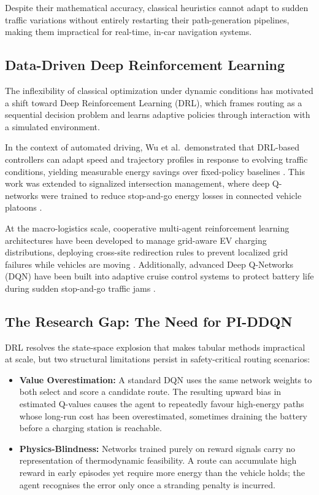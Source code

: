 \documentclass[conference]{IEEEtran}
\begin{document}
Despite their mathematical accuracy, classical heuristics cannot adapt to sudden traffic variations without entirely restarting their path-generation pipelines, making them impractical for real-time, in-car navigation systems.

\subsection{Data-Driven Deep Reinforcement Learning}
The inflexibility of classical optimization under dynamic conditions has motivated a shift toward Deep Reinforcement Learning (DRL), which frames routing as a sequential decision problem and learns adaptive policies through interaction with a simulated environment.

In the context of automated driving, Wu et al.\ demonstrated that DRL-based controllers can adapt speed and trajectory profiles in response to evolving traffic conditions, yielding measurable energy savings over fixed-policy baselines \cite{b9}. This work was extended to signalized intersection management, where deep Q-networks were trained to reduce stop-and-go energy losses in connected vehicle platoons \cite{b10}. 

At the macro-logistics scale, cooperative multi-agent reinforcement learning architectures have been developed to manage grid-aware EV charging distributions, deploying cross-site redirection rules to prevent localized grid failures while vehicles are moving \cite{b11}. Additionally, advanced Deep Q-Networks (DQN) have been built into adaptive cruise control systems to protect battery life during sudden stop-and-go traffic jams \cite{b12}.

\subsection{The Research Gap: The Need for PI-DDQN}
DRL resolves the state-space explosion that makes tabular methods impractical at scale, but two structural limitations persist in safety-critical routing scenarios:
\begin{itemize}
    \item \textbf{Value Overestimation:} A standard DQN uses the same network weights to both select and score a candidate route. The resulting upward bias in estimated Q-values causes the agent to repeatedly favour high-energy paths whose long-run cost has been overestimated, sometimes draining the battery before a charging station is reachable.
    \item \textbf{Physics-Blindness:} Networks trained purely on reward signals carry no representation of thermodynamic feasibility. A route can accumulate high reward in early episodes yet require more energy than the vehicle holds; the agent recognises the error only once a stranding penalty is incurred.
\end{itemize}
\end{document}
